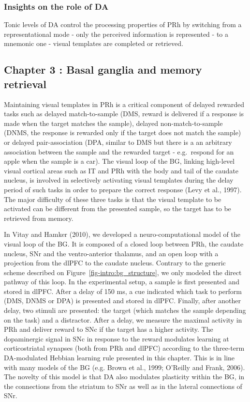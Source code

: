 \documentclass[
  11pt,
  a4paper,
]{scrbook}
\begin{document}
\subsubsection*{Insights on the role of
DA}\label{insights-on-the-role-of-da}

Tonic levels of DA control the processing properties of PRh by switching
from a representational mode - only the perceived information is
represented - to a mnemonic one - visual templates are completed or
retrieved.

\subsection{Chapter 3 : Basal ganglia and memory
retrieval}\label{chapter-3-basal-ganglia-and-memory-retrieval}

Maintaining visual templates in PRh is a critical component of delayed
rewarded tasks such as delayed match-to-sample (DMS, reward is delivered
if a response is made when the target matches the sample), delayed
non-match-to-sample (DNMS, the response is rewarded only if the target
does not match the sample) or delayed pair-association (DPA, similar to
DMS but there is a an arbitrary association between the sample and the
rewarded target - e.g.~respond for an apple when the sample is a car).
The visual loop of the BG, linking high-level visual cortical areas such
as IT and PRh with the body and tail of the caudate nucleus, is involved
in selectively activating visual templates during the delay period of
such tasks in order to prepare the correct response (Levy et al., 1997).
The major difficulty of these three tasks is that the visual template to
be activated can be different from the presented sample, so the target
has to be retrieved from memory.

In Vitay and Hamker (2010), we developed a neuro-computational model of
the visual loop of the BG. It is composed of a closed loop between PRh,
the caudate nucleus, SNr and the ventro-anterior thalamus, and an open
loop with a projection from the dlPFC to the caudate nucleus. Contrary
to the generic scheme described on Figure~\ref{fig-intro:bg_structure},
we only modeled the direct pathway of this loop. In the experimental
setup, a sample is first presented and stored in dlPFC. After a delay of
150 ms, a cue indicated which task to perform (DMS, DNMS or DPA) is
presented and stored in dlPFC. Finally, after another delay, two stimuli
are presented: the target (which matches the sample depending on the
task) and a distractor. After a delay, we measure the maximal activity
in PRh and deliver reward to SNc if the target has a higher activity.
The dopaminergic signal in SNc in response to the reward modulates
learning at corticostriatal synapses (both from PRh and dlPFC) according
to the three-term DA-modulated Hebbian learning rule presented in this
chapter. This is in line with many models of the BG (e.g. Brown et al.,
1999; O'Reilly and Frank, 2006). The novelty of this model is that DA
also modulates plasticity within the BG, in the connections from the
striatum to SNr as well as in the lateral connections of SNr.
\end{document}
